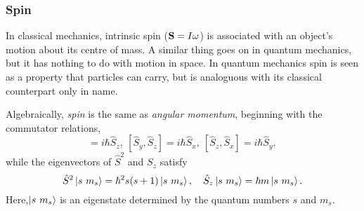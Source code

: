     \subsubsection{Spin}

    In classical mechanics, intrinsic spin ($\vb{S} = I\omega$) is associated with
    an object's motion about its centre of mass. A similar thing goes on in quantum 
    mechanics, but it has nothing to do with motion in space. In quantum mechanics spin 
    is seen as a property that particles can carry, but is analoguous with its classical 
    counterpart only in name.

    Algebraically, \emph{spin} is the same as \emph{angular momentum}, beginning with 
    the commutator relations,
    \begin{equation}
        [\hat{S}_x, \hat{S}_y] = i\hbar \hat{S}_z, \ 
        [\hat{S}_y, \hat{S}_z] = i\hbar \hat{S}_x, \ 
        [\hat{S}_z, \hat{S}_x] = i\hbar \hat{S}_y,
    \end{equation}
    while the eigenvectors of $\hat{S}^2$ and $S_z$ satisfy 
    \begin{equation}
        \hat{S}^2\ket{s\ m_s} = \hbar^2 s(s + 1)\ket{s\ m_s}, \quad
        \hat{S}_z\ket{s\ m_s} = \hbar m \ket{s\ m_s}.
    \end{equation}
    Here,$\ket{s\ m_s}$ is an eigenstate determined by the quantum numbers $s$ and $m_s$.
   
